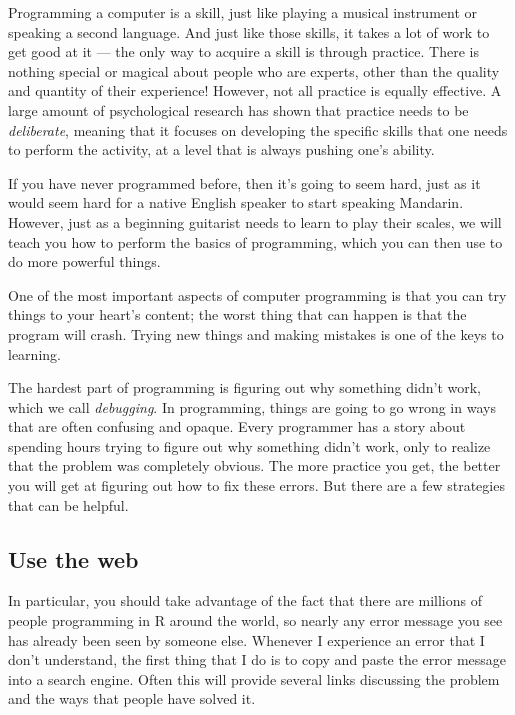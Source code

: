 \documentclass[
  12pt,
]{book}
\begin{document}
Programming a computer is a skill, just like playing a musical instrument or speaking a second language. And just like those skills, it takes a lot of work to get good at it --- the only way to acquire a skill is through practice. There is nothing special or magical about people who are experts, other than the quality and quantity of their experience! However, not all practice is equally effective. A large amount of psychological research has shown that practice needs to be \emph{deliberate}, meaning that it focuses on developing the specific skills that one needs to perform the activity, at a level that is always pushing one's ability.

If you have never programmed before, then it's going to seem hard, just as it would seem hard for a native English speaker to start speaking Mandarin. However, just as a beginning guitarist needs to learn to play their scales, we will teach you how to perform the basics of programming, which you can then use to do more powerful things.

One of the most important aspects of computer programming is that you can try things to your heart's content; the worst thing that can happen is that the program will crash. Trying new things and making mistakes is one of the keys to learning.

The hardest part of programming is figuring out why something didn't work, which we call \emph{debugging}. In programming, things are going to go wrong in ways that are often confusing and opaque. Every programmer has a story about spending hours trying to figure out why something didn't work, only to realize that the problem was completely obvious. The more practice you get, the better you will get at figuring out how to fix these errors. But there are a few strategies that can be helpful.

\hypertarget{use-the-web}{%
\subsection{Use the web}\label{use-the-web}}

In particular, you should take advantage of the fact that there are millions of people programming in R around the world, so nearly any error message you see has already been seen by someone else. Whenever I experience an error that I don't understand, the first thing that I do is to copy and paste the error message into a search engine. Often this will provide several links discussing the problem and the ways that people have solved it.
\end{document}
